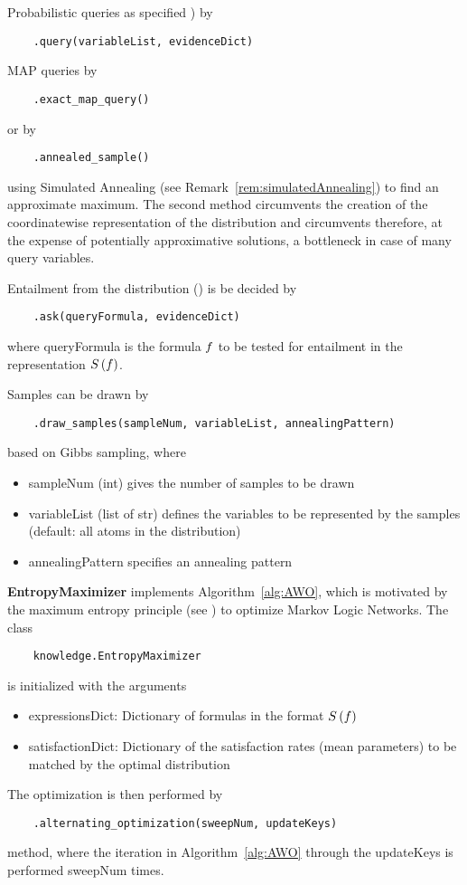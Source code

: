 Probabilistic queries as specified )  by
\begin{lstlisting}
	.query(variableList, evidenceDict)
\end{lstlisting}

MAP queries by
\begin{lstlisting}
	.exact_map_query()
\end{lstlisting}
or by
\begin{lstlisting}
	.annealed_sample()
\end{lstlisting}
using Simulated Annealing (see Remark~\ref{rem:simulatedAnnealing}) to find an approximate maximum.
The second method circumvents the creation of the coordinatewise representation of the distribution and circumvents therefore, at the expense of potentially approximative solutions, a bottleneck in case of many query variables.

Entailment from the distribution () is be decided by
\begin{lstlisting}
	.ask(queryFormula, evidenceDict)
\end{lstlisting}
where queryFormula is the formula $f$ to be tested for entailment in the representation $S\left(f\right)$.

Samples can be drawn by
\begin{lstlisting}
	.draw_samples(sampleNum, variableList, annealingPattern)
\end{lstlisting}
based on Gibbs sampling, where
\begin{itemize}
	\item sampleNum (int) gives the number of samples to be drawn
	\item variableList (list of str) defines the variables to be represented by the samples (default: all atoms in the distribution)
	\item annealingPattern specifies an annealing pattern 
\end{itemize}



\textbf{EntropyMaximizer} implements Algorithm~\ref{alg:AWO}, which is motivated by the maximum entropy principle (see ) to optimize Markov Logic Networks.
The class  
\begin{lstlisting}
	knowledge.EntropyMaximizer
\end{lstlisting}
is initialized with the arguments
\begin{itemize}
	\item expressionsDict: Dictionary of formulas in the format $S\left(f\right)$ 
	\item satisfactionDict: Dictionary of the satisfaction rates (mean parameters) to be matched by the optimal distribution
\end{itemize}
The optimization is then performed by
\begin{lstlisting}
	.alternating_optimization(sweepNum, updateKeys)
\end{lstlisting}
method, where the iteration in Algorithm~\ref{alg:AWO} through the updateKeys is performed sweepNum times.

